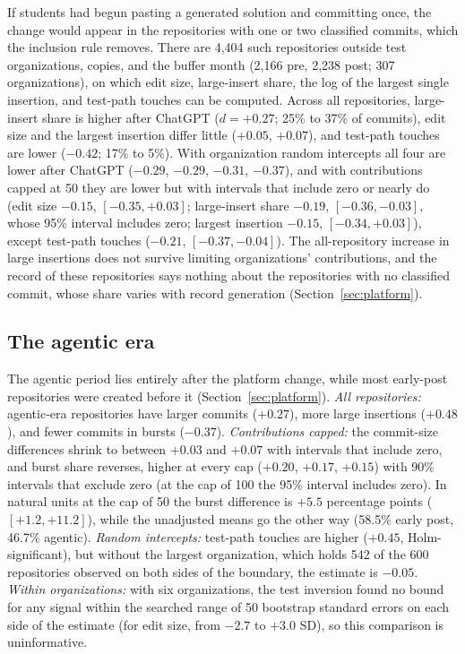 \documentclass[acmsmall,screen,review,anonymous]{acmart}
\begin{document}
If students had begun pasting a generated solution and committing once, the change would appear in the repositories with one or two classified commits, which the inclusion rule removes. There are 4,404 such repositories outside test organizations, copies, and the buffer month (2,166 pre, 2,238 post; 307 organizations), on which edit size, large-insert share, the log of the largest single insertion, and test-path touches can be computed. Across all repositories, large-insert share is higher after ChatGPT ($d = +0.27$; 25\% to 37\% of commits), edit size and the largest insertion differ little ($+0.05$, $+0.07$), and test-path touches are lower ($-0.42$; 17\% to 5\%). With organization random intercepts all four are lower after ChatGPT ($-0.29$, $-0.29$, $-0.31$, $-0.37$), and with contributions capped at 50 they are lower but with intervals that include zero or nearly do (edit size $-0.15$, $[-0.35, +0.03]$; large-insert share $-0.19$, $[-0.36, -0.03]$, whose 95\% interval includes zero; largest insertion $-0.15$, $[-0.34, +0.03]$), except test-path touches ($-0.21$, $[-0.37, -0.04]$). The all-repository increase in large insertions does not survive limiting organizations' contributions, and the record of these repositories says nothing about the repositories with no classified commit, whose share varies with record generation (Section~\ref{sec:platform}).

\subsection{The agentic era}
\label{sec:results-agent}

The agentic period lies entirely after the platform change, while most early-post repositories were created before it (Section~\ref{sec:platform}). \textit{All repositories:} agentic-era repositories have larger commits ($+0.27$), more large insertions ($+0.48$), and fewer commits in bursts ($-0.37$). \textit{Contributions capped:} the commit-size differences shrink to between $+0.03$ and $+0.07$ with intervals that include zero, and burst share reverses, higher at every cap ($+0.20$, $+0.17$, $+0.15$) with 90\% intervals that exclude zero (at the cap of 100 the 95\% interval includes zero). In natural units at the cap of 50 the burst difference is $+5.5$ percentage points ($[+1.2, +11.2]$), while the unadjusted means go the other way (58.5\% early post, 46.7\% agentic). \textit{Random intercepts:} test-path touches are higher ($+0.45$, Holm-significant), but without the largest organization, which holds 542 of the 600 repositories observed on both sides of the boundary, the estimate is $-0.05$. \textit{Within organizations:} with six organizations, the test inversion found no bound for any signal within the searched range of 50 bootstrap standard errors on each side of the estimate (for edit size, from $-2.7$ to $+3.0$ SD), so this comparison is uninformative.
\end{document}
